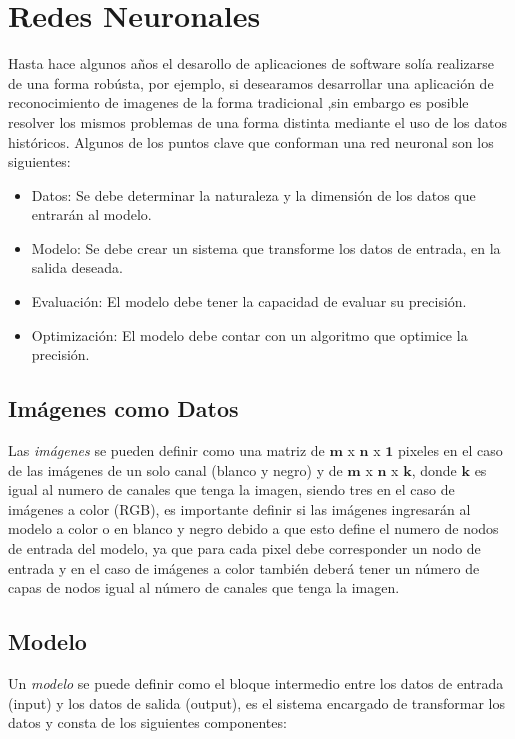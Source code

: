 
\section{Redes Neuronales}

Hasta hace algunos años el desarollo de aplicaciones de software solía realizarse de una forma robústa, por ejemplo, si desearamos desarrollar una aplicación de reconocimiento de imagenes de la forma tradicional ,sin embargo es posible resolver los mismos problemas de una forma distinta mediante el uso de los datos históricos. Algunos de los puntos clave que conforman una red neuronal son los siguientes:

\begin{itemize}
    \item Datos: Se debe determinar la naturaleza y la dimensión de los datos que entrarán al modelo.
    \item Modelo: Se debe crear un sistema que transforme los datos de entrada, en la salida deseada.
    \item Evaluación: El modelo debe tener la capacidad de evaluar su precisión.
    \item Optimización: El modelo debe contar con un algoritmo que optimice la precisión.
\end{itemize}

\subsection{Imágenes como Datos}
Las \emph{imágenes} se pueden definir como una matriz de $\mathbf{m}$ x $\mathbf{n}$ x $\mathbf{1}$ pixeles en el caso de las imágenes de un solo canal (blanco y negro) y de $\mathbf{m}$ x $\mathbf{n}$ x $\mathbf{k}$, donde $\mathbf{k}$ es igual al numero de canales que tenga la imagen, siendo tres en el caso de imágenes a color (RGB), es importante definir si las imágenes ingresarán al modelo a color o en blanco y negro debido a que esto define el numero de nodos de entrada del modelo, ya que para cada pixel debe corresponder un nodo de entrada y en el caso de imágenes a color también deberá tener un número de capas de nodos igual al número de canales que tenga la imagen. 

\subsection{Modelo}
Un \emph{modelo} se puede definir como el bloque intermedio entre los datos de entrada (input) y los datos de salida (output), es el sistema encargado de transformar los datos y consta de los siguientes componentes:

